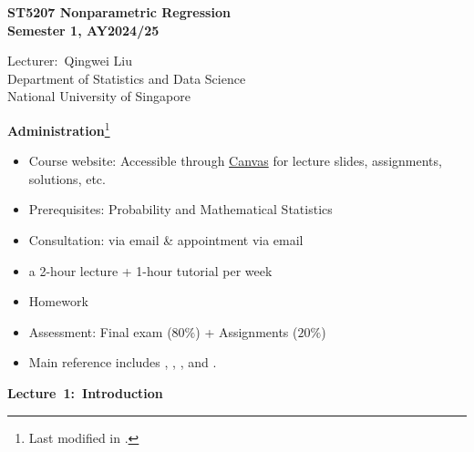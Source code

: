 \documentclass[19pt,landscaoe]{article}
\begin{document}
%

\begin{titlepage}
\begin{center}
    \vfill
\textbf{\huge ST5207 Nonparametric Regression\\
Semester 1, AY2024/25}\\[4cm]
\begin{minipage}{0.4\textwidth}
\begin{center} \large
Lecturer:~Qingwei Liu\\
\vskip 6pt
Department of Statistics and Data Science\\
\vskip 6pt
National University of Singapore
\end{center}
\end{minipage}%
\vfill
\vfill
\end{center}

\end{titlepage}
%
\newpage
{\LARGE\centerline{\textbf {Administration}\footnote{Last modified in .}}}
\vskip25pt
\begin{minipage}{.9\textwidth}
    \Large
\begin{itemize}
\item Course website: Accessible through \href{https://www.nus.edu.sg/canvas/login/}{Canvas} for lecture slides, assignments, solutions, etc. 
\item Prerequisites: Probability and Mathematical Statistics 
\item Consultation: via email \& appointment via email
\item a 2-hour lecture + 1-hour tutorial per week
\item Homework
\item Assessment: Final exam ($80\%$) + Assignments ($20\%$)
\item Main reference includes \cite{hardle04}, \cite{takezawa05}, \cite{Hall13}, and \cite{kloke14}.

\end{itemize}
\end{minipage}
\newpage
{\LARGE\centerline{\textbf{Lecture~1:~Introduction}}}
\vskip25pt
\end{document}
